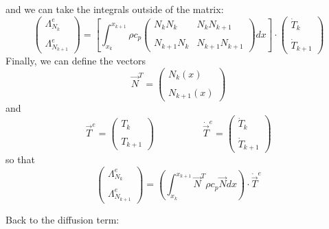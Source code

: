 and we can take the integrals outside of the matrix:
\[
\left(
\begin{array}{c}
{\Lambda}_{N_k}^e \\ \\ {\Lambda}_{N_{k+1}}^e
\end{array}
\right)
=
\left[
\int_{x_k}^{x_{k+1}}
\rho c_p
\left(
\begin{array}{cc}
N_k N_{k}     &  N_k N_{k+1}  \\ \\
N_{k+1} N_{k} &  N_{k+1} N_{k+1} 
\end{array}
\right)
dx
\right]
\cdot
\left(
\begin{array}{c}
\dot{T}_k \\ \\ 
\dot{T}_{k+1}
\end{array}
\right)
\]
Finally, we can define the vectors 
\[
{\vec N}^T = 
\left(
\begin{array}{c}
N_k(x)  \\ \\  N_{k+1} (x)
\end{array}
\right)
\]
and 
\[
{\vec T}^e = 
\left(
\begin{array}{c}
T_k \\ \\ T_{k+1}
\end{array}
\right)
\quad
\quad
\quad
\quad
\quad
\dot{\vec T}^e = 
\left(
\begin{array}{c}
\dot{T}_k \\ \\ \dot{T}_{k+1}
\end{array}
\right)
\]
so that 
\[
\left(
\begin{array}{c}
{\Lambda}_{N_k}^e \\  \\ {\Lambda}_{N_{k+1}}^e
\end{array}
\right)
=
\left( \int_{x_k}^{x_{k+1}}   {\vec N}^T \rho c_p  {\vec N} dx  \right) \cdot \dot{\vec T}^e
\]

Back to the diffusion term:

